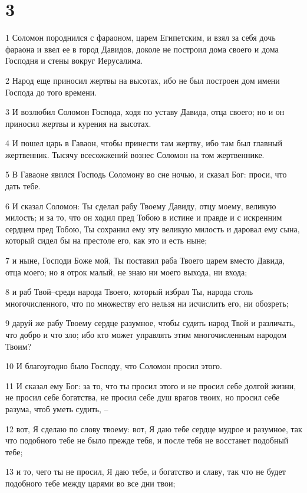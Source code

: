 \chapter{3}

\par 1 Соломон породнился с фараоном, царем Египетским, и взял за себя дочь фараона и ввел ее в город Давидов, доколе не построил дома своего и дома Господня и стены вокруг Иерусалима.
\par 2 Народ еще приносил жертвы на высотах, ибо не был построен дом имени Господа до того времени.
\par 3 И возлюбил Соломон Господа, ходя по уставу Давида, отца своего; но и он приносил жертвы и курения на высотах.
\par 4 И пошел царь в Гаваон, чтобы принести там жертву, ибо там был главный жертвенник. Тысячу всесожжений вознес Соломон на том жертвеннике.
\par 5 В Гаваоне явился Господь Соломону во сне ночью, и сказал Бог: проси, что дать тебе.
\par 6 И сказал Соломон: Ты сделал рабу Твоему Давиду, отцу моему, великую милость; и за то, что он ходил пред Тобою в истине и правде и с искренним сердцем пред Тобою, Ты сохранил ему эту великую милость и даровал ему сына, который сидел бы на престоле его, как это и есть ныне;
\par 7 и ныне, Господи Боже мой, Ты поставил раба Твоего царем вместо Давида, отца моего; но я отрок малый, не знаю ни моего выхода, ни входа;
\par 8 и раб Твой--среди народа Твоего, который избрал Ты, народа столь многочисленного, что по множеству его нельзя ни исчислить его, ни обозреть;
\par 9 даруй же рабу Твоему сердце разумное, чтобы судить народ Твой и различать, что добро и что зло; ибо кто может управлять этим многочисленным народом Твоим?
\par 10 И благоугодно было Господу, что Соломон просил этого.
\par 11 И сказал ему Бог: за то, что ты просил этого и не просил себе долгой жизни, не просил себе богатства, не просил себе душ врагов твоих, но просил себе разума, чтоб уметь судить, --
\par 12 вот, Я сделаю по слову твоему: вот, Я даю тебе сердце мудрое и разумное, так что подобного тебе не было прежде тебя, и после тебя не восстанет подобный тебе;
\par 13 и то, чего ты не просил, Я даю тебе, и богатство и славу, так что не будет подобного тебе между царями во все дни твои;
